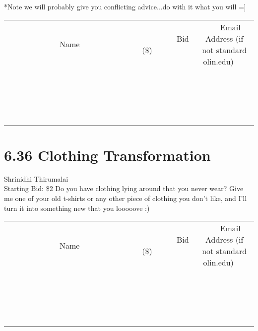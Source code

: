 \documentclass[11pt]{article}
\begin{document}
*Note we will probably give you conflicting advice...do with it what you will =]
\\[3ex]
\begin{tabular}{c c c}
~~~~~~~~~~~~~Name~~~~~~~~~~~~~ & ~~~~~~~~~Bid (\$)~~~~~~~~~  & ~~~Email Address (if not standard olin.edu)~~~\\
 & & \\
\hline
 & & \\
\hline
 & & \\
\hline
 & & \\
\hline
 & & \\
\hline
 & & \\
\hline
 & & \\
\hline
 & & \\
\hline
 & & \\
\hline
 & & \\
\hline
 & & \\
\hline
 & & \\
\hline
 & & \\
\hline
 & & \\
\hline
 & & \\
\hline
 & & \\
\hline
 & & \\
\hline
 & & \\
\hline
 & & \\
\hline
\end{tabular}
\newpage
\section*{6.36 Clothing Transformation}
Shrinidhi Thirumalai
\\
Starting Bid: \$2
\newline
Do you have clothing lying around that you never wear? Give me one of your old t-shirts or any other piece of clothing you don't like, and I'll turn it into something new that you looooove :)
\\[3ex]
\begin{tabular}{c c c}
~~~~~~~~~~~~~Name~~~~~~~~~~~~~ & ~~~~~~~~~Bid (\$)~~~~~~~~~  & ~~~Email Address (if not standard olin.edu)~~~\\
 & & \\
\hline
 & & \\
\hline
 & & \\
\hline
 & & \\
\hline
 & & \\
\hline
 & & \\
\hline
 & & \\
\hline
 & & \\
\hline
 & & \\
\hline
 & & \\
\hline
 & & \\
\hline
 & & \\
\hline
 & & \\
\hline
 & & \\
\hline
 & & \\
\hline
 & & \\
\hline
 & & \\
\hline
 & & \\
\hline
 & & \\
\hline
\end{tabular}
\newpage
\end{document}
